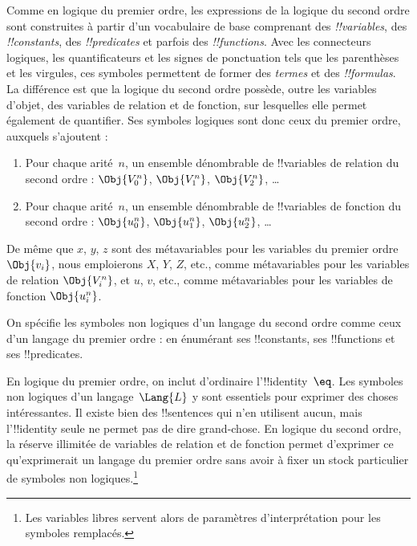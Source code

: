 \documentclass[../../../include/open-logic-section]{subfiles}
\begin{document}


Comme en logique du premier ordre, les expressions
de la logique du second ordre sont construites à
partir d'un vocabulaire de base comprenant des
\emph{!!{variable}s}, des \emph{!!{constant}s},
des \emph{!!{predicate}s} et parfois des
\emph{!!{function}s}. Avec les connecteurs
logiques, les quantificateurs et les signes de
ponctuation tels que les parenthèses et les
virgules, ces symboles permettent de former des
\emph{termes} et des \emph{!!{formula}s}.
La différence est que la logique du second ordre
possède, outre les variables d'objet, des
variables de relation et de fonction, sur lesquelles
elle permet également de quantifier. Ses symboles
logiques sont donc ceux du premier ordre, auxquels
s'ajoutent :

\begin{enumerate}
\item Pour chaque arité~$n$, un ensemble
  dénombrable de !!{variable}s de relation du
  second ordre : $\Obj{V^n_0}$, $\Obj{V^n_1}$,
  $\Obj{V^n_2}$, \dots
\item Pour chaque arité~$n$, un ensemble dénombrable de
  !!{variable}s de fonction du second ordre : $\Obj{u^n_0}$,
  $\Obj{u^n_1}$, $\Obj{u^n_2}$, \dots
\end{enumerate}

De même que $x$, $y$, $z$ sont des métavariables
pour les variables du premier ordre~$\Obj{v_i}$,
nous emploierons $X$, $Y$, $Z$, etc., comme
métavariables pour les variables de relation
$\Obj{V^n_i}$, et $u$, $v$, etc., comme
métavariables pour les variables de fonction
$\Obj{u^n_i}$.

\begin{explain}
On spécifie les symboles non logiques d'un langage
du second ordre comme ceux d'un langage du premier
ordre : en énumérant ses !!{constant}s, ses
!!{function}s et ses !!{predicate}s.

En logique du premier ordre, on inclut d'ordinaire
l'!!{identity}~$\eq$. Les symboles non logiques
d'un langage~$\Lang{L}$ y sont essentiels pour
exprimer des choses intéressantes. Il existe bien
des !!{sentence}s qui n'en utilisent aucun, mais
l'!!{identity} seule ne permet pas de dire
grand-chose. En logique du second ordre, la réserve
illimitée de variables de relation et de fonction
permet d'exprimer ce qu'exprimerait un langage du
premier ordre sans avoir à fixer un stock particulier
de symboles non logiques.\footnote{Les variables libres servent alors de paramètres d'interprétation pour les symboles remplacés.}
\end{explain}
\end{document}
